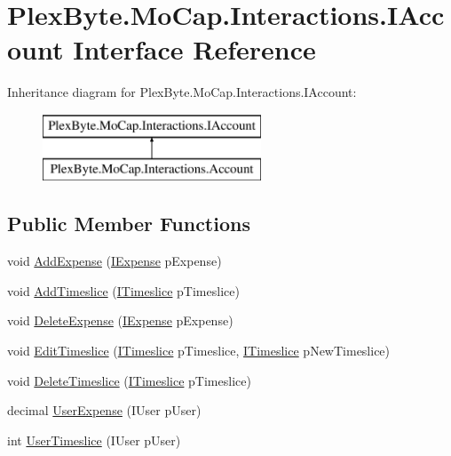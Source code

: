 \hypertarget{interface_plex_byte_1_1_mo_cap_1_1_interactions_1_1_i_account}{}\section{Plex\+Byte.\+Mo\+Cap.\+Interactions.\+I\+Account Interface Reference}
\label{interface_plex_byte_1_1_mo_cap_1_1_interactions_1_1_i_account}
Inheritance diagram for Plex\+Byte.\+Mo\+Cap.\+Interactions.\+I\+Account\+:\begin{figure}[H]
\begin{center}
\leavevmode
\includegraphics[height=2.000000cm]{interface_plex_byte_1_1_mo_cap_1_1_interactions_1_1_i_account}
\end{center}
\end{figure}
\subsection*{Public Member Functions}
\begin{DoxyCompactItemize}
\item 
void \hyperlink{interface_plex_byte_1_1_mo_cap_1_1_interactions_1_1_i_account_a824d1d5e807efd91b8b5297c17615181}{Add\+Expense} (\hyperlink{interface_plex_byte_1_1_mo_cap_1_1_interactions_1_1_i_expense}{I\+Expense} p\+Expense)
\item 
void \hyperlink{interface_plex_byte_1_1_mo_cap_1_1_interactions_1_1_i_account_a32338193fc2a47546efe36dc370b6c1a}{Add\+Timeslice} (\hyperlink{interface_plex_byte_1_1_mo_cap_1_1_interactions_1_1_i_timeslice}{I\+Timeslice} p\+Timeslice)
\item 
void \hyperlink{interface_plex_byte_1_1_mo_cap_1_1_interactions_1_1_i_account_aa16e3839c2d7eeb4b18dd883ba913533}{Delete\+Expense} (\hyperlink{interface_plex_byte_1_1_mo_cap_1_1_interactions_1_1_i_expense}{I\+Expense} p\+Expense)
\item 
void \hyperlink{interface_plex_byte_1_1_mo_cap_1_1_interactions_1_1_i_account_ad71ce3f0f04ba8c3563a2e7d1b53378d}{Edit\+Timeslice} (\hyperlink{interface_plex_byte_1_1_mo_cap_1_1_interactions_1_1_i_timeslice}{I\+Timeslice} p\+Timeslice, \hyperlink{interface_plex_byte_1_1_mo_cap_1_1_interactions_1_1_i_timeslice}{I\+Timeslice} p\+New\+Timeslice)
\item 
void \hyperlink{interface_plex_byte_1_1_mo_cap_1_1_interactions_1_1_i_account_a28f21a9fd3584256cc0f5eeb41477e06}{Delete\+Timeslice} (\hyperlink{interface_plex_byte_1_1_mo_cap_1_1_interactions_1_1_i_timeslice}{I\+Timeslice} p\+Timeslice)
\item 
decimal \hyperlink{interface_plex_byte_1_1_mo_cap_1_1_interactions_1_1_i_account_a4a1424e01898012e5457d777006b2a49}{User\+Expense} (I\+User p\+User)
\item 
int \hyperlink{interface_plex_byte_1_1_mo_cap_1_1_interactions_1_1_i_account_a75c8a9171f868234d85ced97117b1b8b}{User\+Timeslice} (I\+User p\+User)
\end{DoxyCompactItemize}
